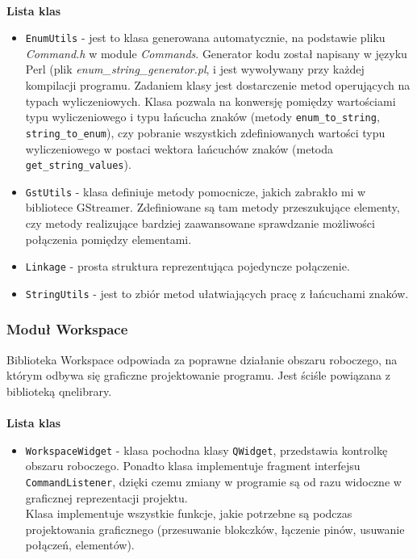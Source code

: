 \documentclass[12pt]{article}
\begin{document}
\paragraph{}
\textbf{Lista klas}
\vspace{-2mm}
\begin{itemize}
 \setlength{\itemsep}{0em}
\item \texttt{EnumUtils} - jest to klasa generowana automatycznie, na podstawie pliku \textit{Command.h} w module \textit{Commands}. Generator kodu został napisany w języku Perl (plik \textit{enum\_string\_generator.pl}, i jest wywoływany przy każdej kompilacji programu.
Zadaniem klasy jest dostarczenie metod operujących na typach wyliczeniowych. Klasa pozwala na konwersję pomiędzy wartościami typu wyliczeniowego i typu łańcucha znaków (metody \texttt{enum\_to\_string}, \texttt{string\_to\_enum}), czy pobranie wszystkich zdefiniowanych wartości typu wyliczeniowego w postaci wektora łańcuchów znaków (metoda \texttt{get\_string\_values}).
\item \texttt{GstUtils} - klasa definiuje metody pomocnicze, jakich zabrakło mi w bibliotece GStreamer. Zdefiniowane są tam metody przeszukujące elementy, czy metody realizujące bardziej zaawansowane sprawdzanie możliwości połączenia pomiędzy elementami.
\item \texttt{Linkage} - prosta struktura reprezentująca pojedyncze połączenie.
\item \texttt{StringUtils} - jest to zbiór metod ułatwiających pracę z łańcuchami znaków.
\end{itemize}
\subsubsection{Moduł Workspace}
Biblioteka Workspace odpowiada za poprawne działanie obszaru roboczego, na którym odbywa się graficzne projektowanie programu. Jest ściśle powiązana z biblioteką qnelibrary.
\paragraph{}
\textbf{Lista klas}
\vspace{-2mm}
\begin{itemize}
  \setlength{\itemsep}{0em}
\item \texttt{WorkspaceWidget} - klasa pochodna klasy \texttt{QWidget}, przedstawia kontrolkę obszaru roboczego. Ponadto klasa implementuje fragment interfejsu \texttt{CommandListener}, dzięki czemu zmiany w programie są od razu widoczne w graficznej reprezentacji projektu. \\
Klasa implementuje wszystkie funkcje, jakie potrzebne są podczas projektowania graficznego (przesuwanie blokczków, łączenie pinów, usuwanie połączeń, elementów).
\end{itemize}
\cleardoublepage
\end{document}
